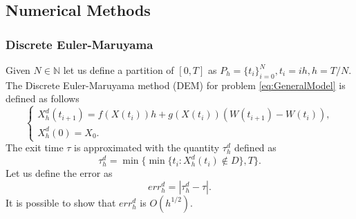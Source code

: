 \subsection{Numerical Methods}

\subsubsection{Discrete Euler-Maruyama}
Given $N \in \mathbb{N}$ let us define a partition of $[0,T]$ as $P_h = \{t_i\}_{i=0}^{N}, t_i = ih, h = T/N$. The Discrete Euler-Maruyama method (DEM) for problem \eqref{eq:GeneralModel} is defined as follows
\begin{equation}\label{eq:DEM}
	\begin{cases}
		X_h^d(t_{i+1}) = f(X(t_i))h + g(X(t_i))(W(t_{i+1}) - W(t_{i})),  \\
		X_h^d(0) = X_0.
	\end{cases}
\end{equation} 
The exit time $\tau$ is approximated with the quantity $\tau_h^d$ defined as 
\begin{equation}\label{eq:TauDEM}
	\tau_h^d = \min\{\min \{t_i \colon X_h^d(t_i) \notin D\},T\}.
\end{equation}
Let us define the error as
\begin{equation}\label{eq:errDEM}
	err_h^d = |\tau_h^d - \tau|.
\end{equation}
It is possible to show \cite{Gobet2001} that $err_h^d$ is $O(h^{1/2})$.

